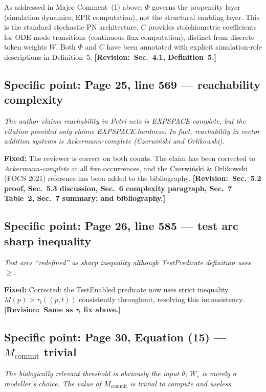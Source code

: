 \documentclass[11pt,letterpaper]{article}
\newcommand{\rquote}[1]{\begin{mdframed}[style=reviewquote]\textit{#1}\end{mdframed}}
\newcommand{\sref}[1]{\textbf{[Revision:~#1]}}
\newcommand{\fixed}[1]{\textcolor{blue!70!black}{\textbf{Fixed:} #1}}
\begin{document}
As addressed in Major Comment~(1) above: $\Phi$ governs the propensity layer
(simulation dynamics, EPR computation), not the structural enabling layer.
This is the standard stochastic PN architecture.
$C$ provides stoichiometric coefficients for ODE-mode transitions (continuous
flux computation), distinct from discrete token weights $W$.
Both $\Phi$ and $C$ have been annotated with explicit simulation-role
descriptions in Definition~5. \sref{Sec.~4.1, Definition~5.}

\subsection*{Specific point: Page 25, line 569 --- reachability complexity}

\rquote{The author claims reachability in Petri nets is EXPSPACE-complete, but
the citation provided only claims EXPSPACE-hardness. In fact, reachability in
vector addition systems is Ackermann-complete (Czerwi\'nski and Orlikowski).}

\fixed{The reviewer is correct on both counts.
The claim has been corrected to \emph{Ackermann-complete} at all five
occurrences, and the Czerwi\'nski \& Orlikowski (FOCS 2021) reference has
been added to the bibliography. \sref{Sec.~5.2 proof, Sec.~5.3 discussion,
Sec.~6 complexity paragraph, Sec.~7 Table~2, Sec.~7 summary; and bibliography.}}

\subsection*{Specific point: Page 26, line 585 --- test arc sharp inequality}

\rquote{Test arcs ``redefined'' as sharp inequality although TestPredicate
definition uses $\geq$.}

\fixed{Corrected: the TestEnabled predicate now uses strict inequality
$M(p) > \tau_t((p,t))$ consistently throughout, resolving this inconsistency.
\sref{Same as $\tau_t$ fix above.}}

\subsection*{Specific point: Page 30, Equation (15) --- $M_{\mathrm{commit}}$
trivial}

\rquote{The biologically relevant threshold is obviously the input $\theta$;
$W_s$ is merely a modeller's choice.
The value of $M_{\mathrm{commit}}$ is trivial to compute and useless.}
\end{document}
